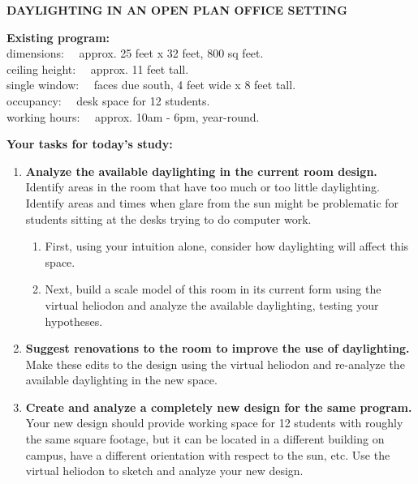 \documentclass[12pt]{article}
\begin{document}
{\bf DAYLIGHTING IN AN OPEN PLAN OFFICE SETTING }

\vspace{0.3in}

{\bf Existing program:}\vspace{0.1in}\\
\hspace*{0.2in}dimensions: ~~approx. 25 feet x 32 feet,  800 sq feet. \\
\hspace*{0.2in}ceiling height: ~~approx. 11 feet tall.\\
\hspace*{0.2in}single window: ~~faces due south, 4 feet wide x 8 feet tall.\\
\hspace*{0.2in}occupancy: ~~desk space for 12 students.\\
\hspace*{0.2in}working hours: ~~approx. 10am - 6pm,  year-round.

\vspace{0.4in}

{\bf Your tasks for today's study:}
\vspace{-0.1in}

\begin{enumerate}
\item {\bf Analyze the available daylighting in the current room
  design.}  Identify areas in the room that have too much or too
  little daylighting.  Identify areas and times when glare from the
  sun might be problematic for students sitting at the desks trying to
  do computer work.

  \begin{enumerate}

  \item First, using your intuition alone, consider how daylighting
    will affect this space.

  \item Next, build a scale model of this room in its current form
    using the virtual heliodon and analyze the available daylighting,
    testing your hypotheses.
    
  \end{enumerate}

\item {\bf Suggest renovations to the room to improve the use of
  daylighting.}  Make these edits to the design using the virtual
  heliodon and re-analyze the available daylighting in the new
  space.

\item {\bf Create and analyze a completely new design for the same
  program. } Your new design should provide working space for 12
  students with roughly the same square footage, but it can be located
  in a different building on campus, have a different orientation with
  respect to the sun, etc.  Use the virtual heliodon to sketch and
  analyze your new design.

\end{enumerate}
\end{document}
